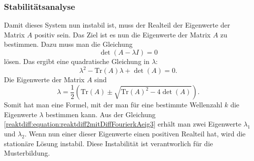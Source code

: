 
\subsubsection{Stabilitätsanalyse}
Damit dieses System nun instabil ist, muss der Realteil der Eigenwerte der Matrix \(A\) positiv sein.
Das Ziel ist es nun die Eigenwerte der Matrix \(A\) zu bestimmen.
Dazu muss man die Gleichung
\begin{equation*}
    \det(A - \lambda I) = 0
\end{equation*}
lösen.
Das ergibt eine quadratische Gleichung in \(\lambda\):
\begin{equation*}
    \lambda^2 - \text{Tr}(A) \lambda + \det(A) = 0.
\end{equation*}
Die Eigenwerte der Matrix \(A\) sind
\begin{equation}
    \lambda = \frac{1}{2} \left( \text{Tr}(A) \pm 
    \sqrt{\text{Tr}(A)^2 - 4 \det(A)} \right).
\label{reaktdiff:equation:reaktdiff2mitDiffFourierkAeig3}
\end{equation}
Somit hat man eine Formel, mit der man für eine bestimmte Wellenzahl \(k\) die Eigenwerte \(\lambda\) bestimmen kann.
Aus der Gleichung \eqref{reaktdiff:equation:reaktdiff2mitDiffFourierkAeig3} erhält man zwei Eigenwerte \(\lambda_1\) und \(\lambda_2\).
Wenn nun einer dieser Eigenwerte einen positiven Realteil hat, wird die stationäre Lösung instabil.
Diese Instabilität ist verantworlich für die Musterbildung.


